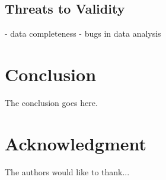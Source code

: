 \documentclass[conference]{IEEEtran}
\begin{document}
\subsection{Threats to Validity}

- data completeness
- bugs in data analysis

\section{Conclusion}
The conclusion goes here.






\section*{Acknowledgment}


The authors would like to thank...




\end{document}

